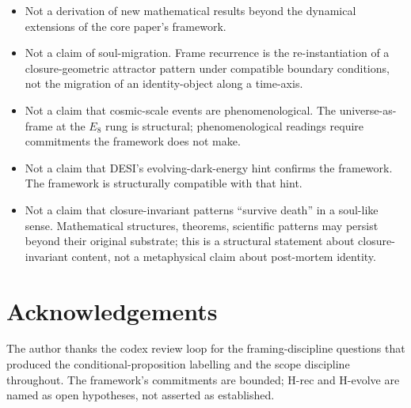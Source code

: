 \documentclass[11pt]{article}
\theoremstyle{plain}
\theoremstyle{definition}
\theoremstyle{remark}
\begin{document}
\begin{itemize}[leftmargin=2em]
\item Not a derivation of new mathematical results beyond the dynamical extensions of the core paper's framework.
\item Not a claim of soul-migration. Frame recurrence is the re-instantiation of a closure-geometric attractor pattern under compatible boundary conditions, not the migration of an identity-object along a time-axis.
\item Not a claim that cosmic-scale events are phenomenological. The universe-as-frame at the $E_8$ rung is structural; phenomenological readings require commitments the framework does not make.
\item Not a claim that DESI's evolving-dark-energy hint confirms the framework. The framework is structurally compatible with that hint.
\item Not a claim that closure-invariant patterns ``survive death'' in a soul-like sense. Mathematical structures, theorems, scientific patterns may persist beyond their original substrate; this is a structural statement about closure-invariant content, not a metaphysical claim about post-mortem identity.
\end{itemize}

\section*{Acknowledgements}

The author thanks the codex review loop for the framing-discipline questions that produced the conditional-proposition labelling and the scope discipline throughout. The framework's commitments are bounded; H-rec and H-evolve are named as open hypotheses, not asserted as established.



\end{document}
